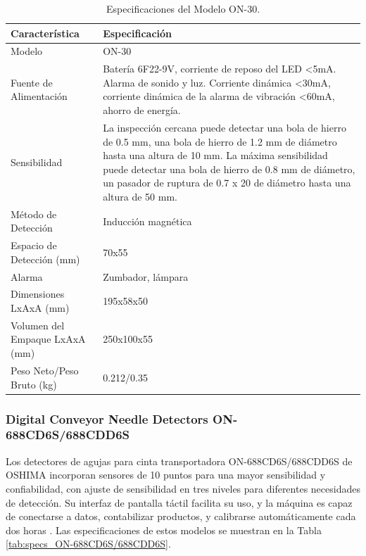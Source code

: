 \begin{table}[H]
	\caption{Especificaciones del Modelo ON-30.}
	\begin{tabularx}{\textwidth}{|l|X|}
		\hline
		\textbf{Característica} & \textbf{Especificación} \\ \hline
		Modelo & ON-30 \\ \hline
		Fuente de Alimentación & Batería 6F22-9V, corriente de reposo del LED <5mA. Alarma de sonido y luz. Corriente dinámica <30mA, corriente dinámica de la alarma de vibración <60mA, ahorro de energía. \\ \hline
		Sensibilidad & La inspección cercana puede detectar una bola de hierro de 0.5 mm, una bola de hierro de 1.2 mm de diámetro hasta una altura de 10 mm. La máxima sensibilidad puede detectar una bola de hierro de 0.8 mm de diámetro, un pasador de ruptura de 0.7 x 20 de diámetro hasta una altura de 50 mm. \\ \hline
		Método de Detección & Inducción magnética \\ \hline
		Espacio de Detección (mm) & 70x55 \\ \hline
		Alarma & Zumbador, lámpara \\ \hline
		Dimensiones LxAxA (mm) & 195x58x50 \\ \hline
		Volumen del Empaque LxAxA (mm) & 250x100x55 \\ \hline
		Peso Neto/Peso Bruto (kg) & 0.212/0.35 \\ \hline
	\end{tabularx}
	\label{tab:specs_ON_30}
\end{table}

\subsubsection{Digital Conveyor Needle Detectors ON-688CD6S/688CDD6S}

Los detectores de agujas para cinta transportadora ON-688CD6S/688CDD6S de OSHIMA incorporan sensores de 10 puntos para una mayor sensibilidad y confiabilidad, con ajuste de sensibilidad en tres niveles para diferentes necesidades de detección. Su interfaz de pantalla táctil facilita su uso, y la máquina es capaz de conectarse a datos, contabilizar productos, y calibrarse automáticamente cada dos horas \cite{oshimaOSHIMAGarment}. Las especificaciones de estos modelos se muestran en la Tabla \ref{tab:specs_ON-688CD6S/688CDD6S}.

